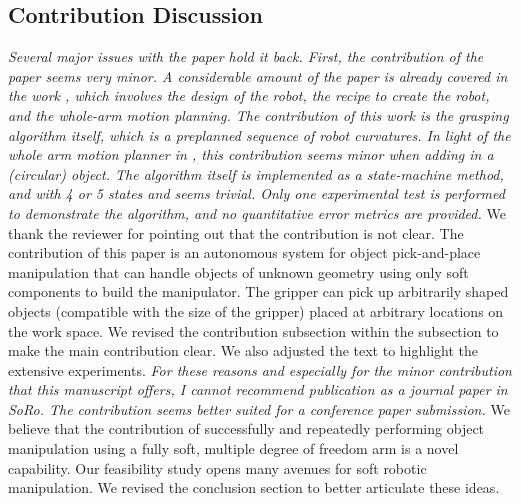 \documentclass[letterpaper, 10 pt, twocolumn, conference]{article}
\begin{document}
\subsection{Contribution Discussion}
\textit{Several major issues with the paper hold it back. First, the contribution of the paper seems very minor. A considerable amount of the paper is already covered in the work\cite{marchese2014whole} \cite{marchese2014design} \cite{marchese2015recipe}, which involves the design of the robot, the recipe to create the robot, and the whole-arm motion planning. The contribution of this work is the grasping algorithm itself, which is a preplanned sequence of robot curvatures. In light of the whole arm motion planner in  \cite{marchese2014whole}, this contribution seems minor when adding in a (circular) object.  The algorithm itself is implemented as a state-machine method, and with 4 or 5 states and seems trivial. Only one experimental test is performed to demonstrate the algorithm, and no quantitative error metrics are provided.}
%
We thank the reviewer for pointing out that the contribution is not clear. The contribution of this paper is an autonomous system for object pick-and-place manipulation that can handle objects of unknown geometry using only soft components to build the manipulator. The gripper can pick up arbitrarily shaped objects (compatible with the size of the gripper) placed at arbitrary locations on the work space. We revised the contribution subsection within the subsection to make the main contribution clear. We also adjusted the text to highlight the extensive experiments. 
%
\textit{For these reasons and especially for the minor contribution that this manuscript offers, I cannot recommend publication as a journal paper in SoRo. The contribution seems better suited for a conference paper submission.}
%
We believe that the contribution of successfully and repeatedly performing object manipulation using a fully soft, multiple degree of freedom arm is a novel capability. Our feasibility study opens many avenues for soft robotic manipulation. We revised the conclusion section to better articulate these ideas. 
%
\end{document}
